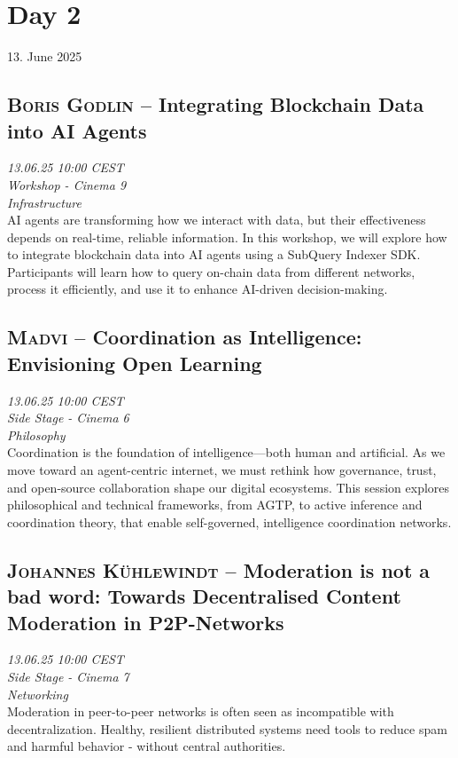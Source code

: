 \clearpage
\section {Day 2} 13. June 2025\cleardoublepage
\subsection {\textsc{Boris Godlin}  -- Integrating Blockchain Data into AI Agents} \noindent \textit {13.06.25 10:00 CEST\\ Workshop - Cinema 9\\ Infrastructure}\\[1em] AI agents are transforming how we interact with data, but their effectiveness depends on real-time, reliable information. In this workshop, we will explore how to integrate blockchain data into AI agents using a SubQuery Indexer SDK. Participants will learn how to query on-chain data from different networks, process it efficiently, and use it to enhance AI-driven decision-making.

\clearpage
\subsection {\textsc{Madvi}  -- Coordination as Intelligence: Envisioning Open Learning} \noindent \textit {13.06.25 10:00 CEST\\ Side Stage - Cinema 6\\ Philosophy}\\[1em] Coordination is the foundation of intelligence—both human and artificial. As we move toward an agent-centric internet, we must rethink how governance, trust, and open-source collaboration shape our digital ecosystems. This session explores philosophical and technical frameworks, from AGTP, to active inference and coordination theory, that enable self-governed, intelligence coordination networks.

\clearpage
\subsection {\textsc{Johannes Kühlewindt}  -- Moderation is not a bad word: Towards Decentralised Content Moderation in P2P-Networks} \noindent \textit {13.06.25 10:00 CEST\\ Side Stage - Cinema 7\\ Networking}\\[1em] Moderation in peer-to-peer networks is often seen as incompatible with decentralization. Healthy, resilient distributed systems need tools to reduce spam and harmful behavior - without central authorities.

